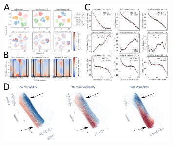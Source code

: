 \begin{figure}[ht]
\centering
\includegraphics[width=0.8\textwidth]{images/chapter_4/dynamic_repr_42.png}

\end{figure}
